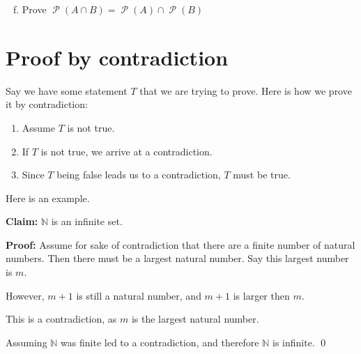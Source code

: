 \documentclass[12pt,letterpaper]{article}
\newcommand\N{\mathbb N}
\newcommand\Pow{\ensuremath{\operatorname{\mathcal{P}}}}
\newif\ifsol
\begin{document}
	  \begin{enumerate}[a.]
         \setcounter{enumi}{5}

		\item Prove  $\Pow{(A\cap B)} = \Pow{(A)}\cap \Pow{(B)}$

		\begin{mdframed}
		\ifsol
		\begin{align*}
		&x \in \Pow{(A\cap B)} \\	
		\iff & x \subseteq A \cap B \\
		\iff & x \subseteq A \text{ and } x \subseteq B \\
		\iff & x \in \Pow{(A)} \text{ and } x \in \Pow{(B)} \\
		\iff & x \in \Pow{(A)}\cap \Pow{(B)}
		\end{align*} \qed
		\else
		\vspace{6cm}
		\fi
		\end{mdframed}
		
	\end{enumerate}

      \section*{Proof by contradiction}

      Say we have some statement $T$ that we are trying to prove. Here is how we prove it by contradiction:
      \begin{enumerate}
        \item Assume $T$ is not true.
        \item If $T$ is not true, we arrive at a contradiction. 
        \item Since $T$ being false leads us to a contradiction, $T$ must be true.
      \end{enumerate}

      Here is an example.

      \textbf{Claim:} $\N$ is an infinite set.

      \textbf{Proof:} Assume for sake of contradiction that there are a finite number of natural numbers. Then there must be a largest natural number. Say this largest number is $m$. 

      However, $m+1$ is still a natural number, and $m+1$ is larger then $m$. 

      This is a contradiction, as $m$ is the largest natural number.

      Assuming $\N$ was finite led to a contradiction, and therefore $\N$ is infinite. \qed
\end{document}

